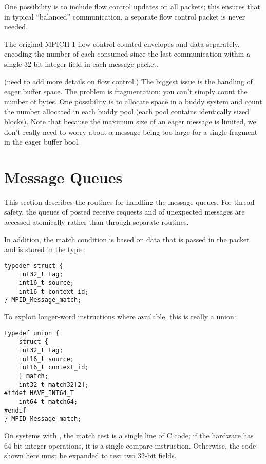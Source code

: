 \documentclass{article}
\begin{document}
One possibility is to include flow control updates on all packets; this
ensures that in typical ``balanced'' communication, a separate flow control
packet is never needed.  

The original MPICH-1 flow control counted envelopes and data
separately, encoding the number of each consumed since the last
communication within a single 32-bit integer field in each message
packet.  

(need to add more details on flow control.)  
The biggest issue is the
handling of eager buffer space.  The problem is fragmentation; you
can't simply count the number of bytes.  One possibility is to
allocate space in a buddy system and count the number allocated in
each buddy pool (each pool contains identically sized blocks).  Note
that because the maximum size of an eager message is limited, we don't
really need to worry about a message being too large for a single
fragment in the eager buffer bool.

\section{Message Queues}
This section describes the routines for handling the message queues.  For
thread safety, the queues of posted receive requests and of unexpected
messages are accessed atomically rather than through separate routines.

In addition, the match condition is based on data that is passed in the packet
and is stored in the type :
\begin{verbatim}
typedef struct {
    int32_t tag;
    int16_t source;
    int16_t context_id;
} MPID_Message_match;
\end{verbatim}
To exploit longer-word instructions where available, this is really a
union:
\begin{verbatim}
typedef union { 
    struct { 
    int32_t tag;
    int16_t source;
    int16_t context_id;
    } match;
    int32_t match32[2];
#ifdef HAVE_INT64_T
    int64_t match64;
#endif
} MPID_Message_match;
\end{verbatim}

On systems with , the match test is a single line of C code; if
the hardware has 64-bit integer operations, it is a single compare
instruction.  Otherwise, the code shown here must be expanded to test
two 32-bit fields.  
\end{document}
